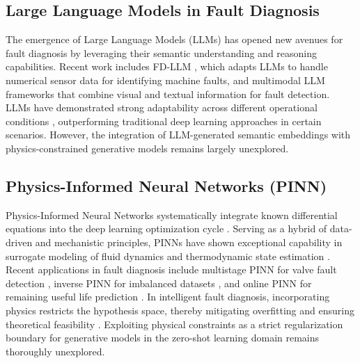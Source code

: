 \subsection{Large Language Models in Fault Diagnosis}
The emergence of Large Language Models (LLMs) has opened new avenues for fault diagnosis by leveraging their semantic understanding and reasoning capabilities. Recent work includes FD-LLM \cite{fdllm2025}, which adapts LLMs to handle numerical sensor data for identifying machine faults, and multimodal LLM frameworks \cite{mllm2024} that combine visual and textual information for fault detection. LLMs have demonstrated strong adaptability across different operational conditions \cite{arxiv2024fdllm}, outperforming traditional deep learning approaches in certain scenarios. However, the integration of LLM-generated semantic embeddings with physics-constrained generative models remains largely unexplored.

\subsection{Physics-Informed Neural Networks (PINN)}
Physics-Informed Neural Networks systematically integrate known differential equations into the deep learning optimization cycle \cite{raissi2019physics}. Serving as a hybrid of data-driven and mechanistic principles, PINNs have shown exceptional capability in surrogate modeling of fluid dynamics and thermodynamic state estimation \cite{chen2021physics}. Recent applications in fault diagnosis include multistage PINN for valve fault detection \cite{energies2024multistage}, inverse PINN for imbalanced datasets \cite{plosone2025inverse}, and online PINN for remaining useful life prediction \cite{nature2025online}. In intelligent fault diagnosis, incorporating physics restricts the hypothesis space, thereby mitigating overfitting and ensuring theoretical feasibility \cite{yucesan2022hybrid}. Exploiting physical constraints as a strict regularization boundary for generative models in the zero-shot learning domain remains thoroughly unexplored.
